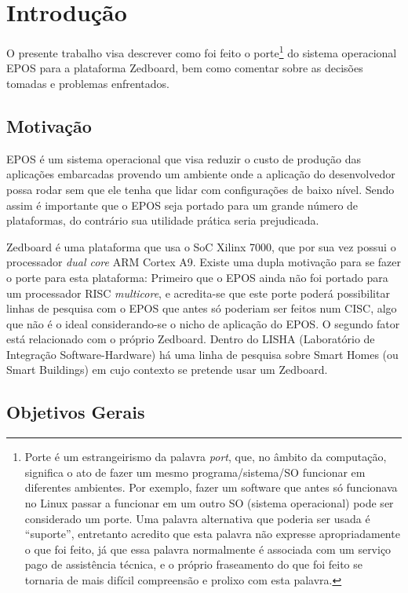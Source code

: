 \documentclass{ufscThesis/ufscThesis} %
\begin{document}
\chapter{Introdução}

O presente trabalho visa descrever como foi feito o porte\footnote{Porte é um estrangeirismo da palavra \emph{port}, que, no âmbito da computação, significa o ato de fazer um mesmo programa/sistema/SO funcionar em diferentes ambientes. Por exemplo, fazer um software que antes só funcionava no Linux passar a funcionar em um outro SO (sistema operacional) pode ser considerado um porte. Uma palavra alternativa que poderia ser usada é ``suporte'', entretanto acredito que esta palavra não expresse apropriadamente o que foi feito, já que essa palavra normalmente é associada com um serviço pago de assistência técnica, e o próprio fraseamento do que foi feito se tornaria de mais difícil compreensão e prolixo com esta palavra.} do sistema operacional EPOS para a plataforma Zedboard, bem como comentar sobre as decisões tomadas e problemas enfrentados.

\section{Motivação}
EPOS é um sistema operacional que visa reduzir o custo de produção das aplicações embarcadas provendo um ambiente onde a aplicação do desenvolvedor possa rodar sem que ele tenha que lidar com configurações de baixo nível. Sendo assim é importante que o EPOS seja portado para um grande número de plataformas, do contrário sua utilidade prática seria prejudicada.

Zedboard é uma plataforma que usa o SoC Xilinx 7000, que por sua vez possui o processador \emph{dual core} ARM Cortex A9. Existe uma dupla motivação para se fazer o porte para esta plataforma: Primeiro que o EPOS ainda não foi portado para um processador RISC \emph{multicore}, e acredita-se que este porte poderá possibilitar linhas de pesquisa com o EPOS que antes só poderiam ser feitos num CISC, algo que não é o ideal considerando-se o nicho de aplicação do EPOS. O segundo fator está relacionado com o próprio Zedboard. Dentro do LISHA (Laboratório de Integração Software-Hardware) há uma linha de pesquisa sobre Smart Homes (ou Smart Buildings) em cujo contexto se pretende usar um Zedboard.

\section{Objetivos Gerais}
\end{document}

